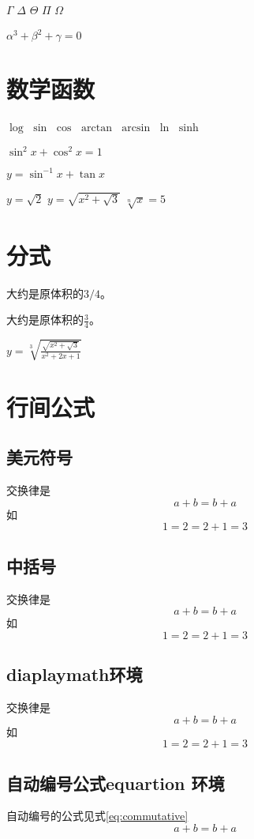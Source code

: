 \documentclass{article} %
\begin{document}
	$ \Gamma $ $ \Delta $ $ \Theta $ $ \Pi $ $ \Omega $
	
	$ \alpha^3 + \beta^2 + \gamma = 0 $
	
	\section{数学函数}
	$ \log $ $ \sin $ $ \cos $ $ \arctan $ $ \arcsin $ $ \ln $ $ \sinh $
	
	$ \sin^2 x + \cos^2 x = 1 $
	
	$ y = \sin^{-1} x + \tan x $
	
	$ y =  \sqrt{2} $  $ y = \sqrt{x^2 + \sqrt{3}} $ $ \sqrt[n]{x} = 5 $
	
	\section{分式}
	大约是原体积的$ 3/4 $。
	
	大约是原体积的$ \frac{3}{4} $。
	
	$ y = \sqrt[3]{\frac{\sqrt{x^2 + \sqrt{3}}}{x^2 + 2x + 1 } }$
	
	\section{行间公式}
	\subsection{美元符号}
	交换律是 $$ a + b= b + a $$ 如$$ 1 = 2 = 2 + 1 = 3 $$
	
	\subsection{中括号}
	交换律是 \[ a + b= b + a \] 如 \[ 1 = 2 = 2 + 1 = 3 \]
	
	\subsection{diaplaymath环境}
	交换律是 
	\begin{displaymath}
	a + b= b + a
	\end{displaymath}  
	如 
	\begin{displaymath}
	1 = 2 = 2 + 1 = 3
	\end{displaymath}
	
	\subsection{自动编号公式equartion 环境}
	自动编号的公式见式\ref{eq:commutative}
	\begin{equation}
		a + b= b + a \label{eq:commutative}
	\end{equation}
	
\end{document}
